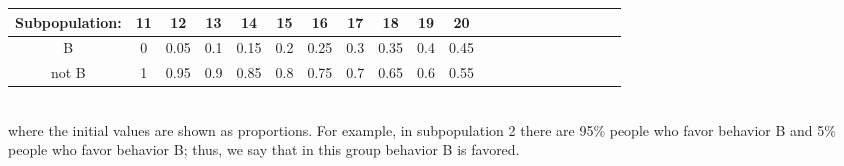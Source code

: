 \documentclass[a4paper,8pt]{extarticle}
\begin{document}
\begin{center}
\begin{tabular}{||c|c|c|c|c|c|c|c|c|c|c|c|c|c|c|c|c|c|c|c|c||} 
 \hline
  Subpopulation: &11&12&13&14&15&16&17&18&19&20 \\ [0.5ex] 
 \hline\hline
 B &0&0.05&0.1&0.15&0.2&0.25&0.3&0.35&0.4&0.45\\ 
 \hline
 not B & 1&0.95&0.9&0.85&0.8&0.75&0.7&0.65&0.6&0.55\\
 \hline
\end{tabular}
\end{center}
\\
where the initial values are shown as proportions. For example, in subpopulation 2 there are 95\% people who favor behavior B and 5\% people who favor behavior B; thus, we say that in this group behavior B is favored.
\end{document}
